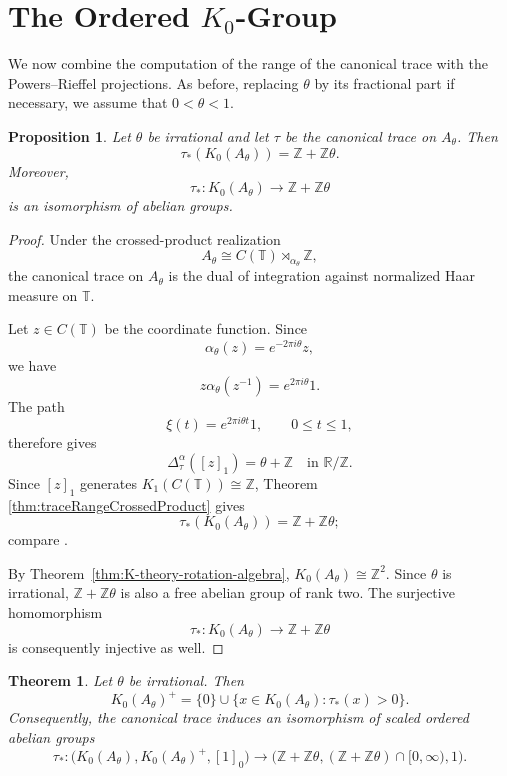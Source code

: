 \documentclass{book}
\newtheorem{proposition}[definition]{Proposition}
\newtheorem{theorem}[definition]{Theorem}
\begin{document}
\section{The Ordered \texorpdfstring{\(K_0\)}{K0}-Group}
 
We now combine the computation of the range of the canonical trace with
the Powers--Rieffel projections. As before, replacing \(\theta\) by its
fractional part if necessary, we assume that \(0<\theta<1\).

\begin{proposition}\label{prop:traceRangeRotationAlgebra}
Let \(\theta\) be irrational and let \(\tau\) be the canonical trace on
\(A_\theta\). Then
\[
  \tau_*(K_0(A_\theta))
  =
  \mathbb Z+\mathbb Z\theta.
\]
Moreover,
\[
  \tau_*:K_0(A_\theta)\longrightarrow
  \mathbb Z+\mathbb Z\theta
\]
is an isomorphism of abelian groups.
\end{proposition}

\begin{proof}
Under the crossed-product realization
\[
  A_\theta\cong C(\mathbb T)\rtimes_{\alpha_\theta}\mathbb Z,
\]
the canonical trace on \(A_\theta\) is the dual of integration against
normalized Haar measure on \(\mathbb T\).

Let \(z\in C(\mathbb T)\) be the coordinate function. Since
\[
  \alpha_\theta(z)=e^{-2\pi i\theta}z,
\]
we have
\[
  z\alpha_\theta(z^{-1})=e^{2\pi i\theta}1.
\]
The path
\[
  \xi(t)=e^{2\pi i\theta t}1,
  \qquad 0\leq t\leq1,
\]
therefore gives
\[
  \Delta_\tau^\alpha([z]_1)
  =
  \theta+\mathbb Z
  \quad\text{in }\mathbb R/\mathbb Z.
\]
Since \([z]_1\) generates
\(K_1(C(\mathbb T))\cong\mathbb Z\), Theorem
\ref{thm:traceRangeCrossedProduct} gives
\[
  \tau_*(K_0(A_\theta))
  =
  \mathbb Z+\mathbb Z\theta;
\]
compare \cite[Exercise~10.11.6(d)]{Blackadar1998}.

By Theorem~\ref{thm:K-theory-rotation-algebra},
\(K_0(A_\theta)\cong\mathbb Z^2\). Since \(\theta\) is irrational,
\(\mathbb Z+\mathbb Z\theta\) is also a free abelian group of rank two.
The surjective homomorphism
\[
  \tau_*:K_0(A_\theta)\longrightarrow
  \mathbb Z+\mathbb Z\theta
\]
is consequently injective as well.
\end{proof}
\begin{theorem}\label{thm:orderedK0RotationAlgebra}
Let \(\theta\) be irrational. Then
\[
  K_0(A_\theta)^+
  =
  \{0\}
  \cup
  \{x\in K_0(A_\theta):\tau_*(x)>0\}.
\]
Consequently, the canonical trace induces an isomorphism of scaled
ordered abelian groups
\[
  \tau_*:
  \bigl(K_0(A_\theta),K_0(A_\theta)^+,[1]_{0}\bigr)
  \longrightarrow
  \bigl(
    \mathbb Z+\mathbb Z\theta,
    (\mathbb Z+\mathbb Z\theta)\cap[0,\infty),
    1
  \bigr).
\]
\end{theorem}
\end{document}
